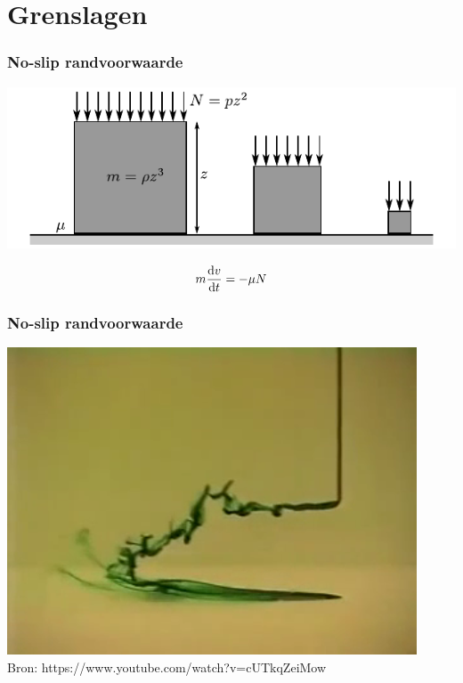 \documentclass[t]{beamer}
\begin{document}
	\section{Grenslagen}
	\begin{frame}
		\frametitle{No-slip randvoorwaarde}
		\vspace{1cm}
		\center
		\includegraphics{../fig/uitwendige_stroming/No-slip_statische_wrijving}
		
		\pause
		\begin{equation*}
			m \frac{\mathrm{d} v}{\mathrm{d} t} = -\mu N
		\end{equation*}
  	\end{frame}
	\begin{frame}
		\frametitle{No-slip randvoorwaarde}
		\center
		\href{run:fig/uitwendige_stroming/No-Slip_condition.mp4}{
			\includegraphics[height=0.8\textheight]{../fig/uitwendige_stroming/No-Slip_condition.png}
		}\\
		\footnotesize{Bron: https://www.youtube.com/watch?v=cUTkqZeiMow}
  	\end{frame}
\end{document}
